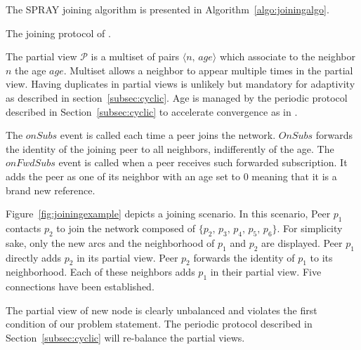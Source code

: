 
The SPRAY{} joining algorithm is presented in
Algorithm~\ref{algo:joiningalgo}.

\begin{algorithm}

\caption{\label{algo:joiningalgo}The joining protocol of \SPRAY{}.}
\end{algorithm}

The partial view $\mathcal{P}$ is a multiset of pairs
$\langle n,\, age\rangle$ which associate to the neighbor $n$ the age
$age$. Multiset allows a neighbor to appear multiple times in the
partial view. Having duplicates in partial views is unlikely but
mandatory for adaptivity as described in
section~\ref{subsec:cyclic}. Age is managed by the periodic protocol
described in Section~\ref{subsec:cyclic} to accelerate convergence as
in \CYCLON{}. 

The $onSubs$ event is called each time a peer joins the
network. $OnSubs$ forwards the identity of the joining peer to all
neighbors, indifferently of the age. The $onFwdSubs$ event is called
when a peer receives such forwarded subscription. It adds the peer as
one of its neighbor with an age set to $0$ meaning that it is a brand
new reference.

Figure~\ref{fig:joiningexample} depicts a
joining scenario. In this scenario, Peer $p_1$ contacts $p_2$ to join
the network composed of $\{p_2,\,p_3,\,p_4,\,p_5,\,p_6\}$. For
simplicity sake, only the new arcs and the neighborhood of $p_1$ and
$p_2$ are displayed. Peer $p_1$ directly adds $p_2$ in its partial
view. Peer $p_2$ forwards the identity of $p_1$ to its
neighborhood. Each of these neighbors adds $p_1$ in their partial
view. Five connections have been established.

The partial view of new node is clearly unbalanced and violates the
first condition of our problem statement. The periodic protocol
described in Section~\ref{subsec:cyclic} will re-balance the partial
views.


